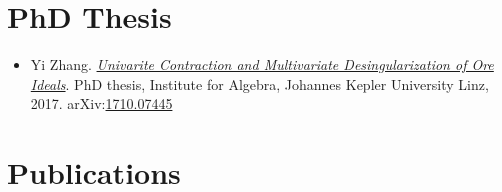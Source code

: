 \documentclass[a4paper,12pt]{article}
\begin{document}
\section*{\Large{PhD Thesis}}
\begin{itemize}
 \item Yi Zhang. \href{https://yzhang1616.github.io/yzhang_PhDthesis_final.pdf}{{\em Univarite 
                Contraction and Multivariate Desingularization of Ore Ideals}}. 
                PhD thesis, Institute for Algebra, Johannes Kepler University Linz, 2017. 
                arXiv:\href{https://arxiv.org/abs/1710.07445}{1710.07445}
\end{itemize}

\section*{\Large{Publications}}
\end{document}
